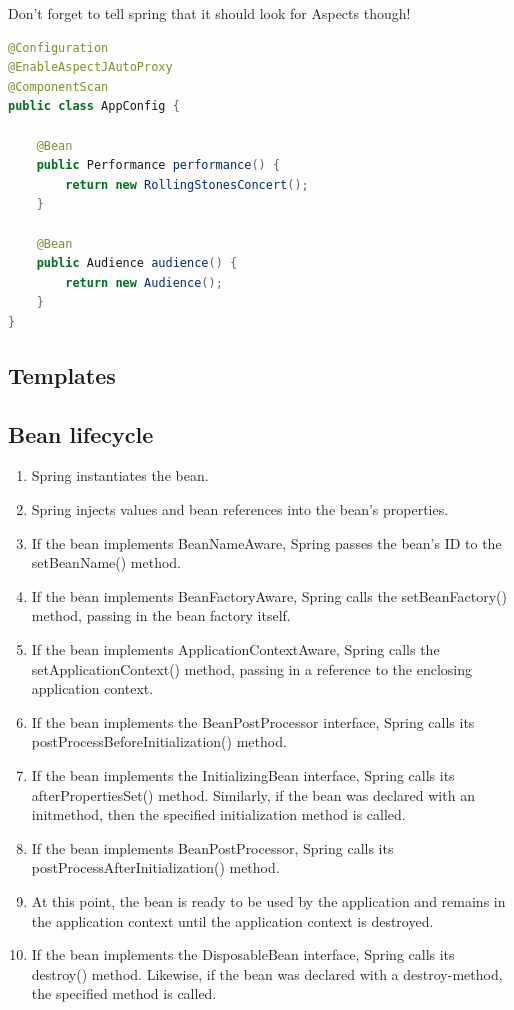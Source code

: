 Don't forget to tell spring that it should look for Aspects though!

\begin{lstlisting}[language=java]
@Configuration
@EnableAspectJAutoProxy
@ComponentScan
public class AppConfig {

	@Bean
	public Performance performance() {
		return new RollingStonesConcert();
	}
	
	@Bean
	public Audience audience() {
		return new Audience();
	}
}
\end{lstlisting}

\subsection{Templates}


\subsection{Bean lifecycle}
\begin{enumerate}
\item Spring instantiates the bean.
\item Spring injects values and bean references into the bean’s properties.
\item If the bean implements BeanNameAware, Spring passes the bean’s ID to the setBeanName() method.
\item If the bean implements BeanFactoryAware, Spring calls the setBeanFactory()
method, passing in the bean factory itself.
\item If the bean implements ApplicationContextAware, Spring calls the setApplicationContext() method, passing in a reference to the enclosing application
context.
\item If the bean implements the BeanPostProcessor interface, Spring calls its postProcessBeforeInitialization() method.
\item If the bean implements the InitializingBean interface, Spring calls its afterPropertiesSet() method. Similarly, if the bean was declared with an initmethod,
then the specified initialization method is called.
\item If the bean implements BeanPostProcessor, Spring calls its postProcessAfterInitialization() method.
\item At this point, the bean is ready to be used by the application and remains in the
application context until the application context is destroyed.
\item If the bean implements the DisposableBean interface, Spring calls its
destroy() method. Likewise, if the bean was declared with a destroy-method,
the specified method is called.
\end{enumerate}


